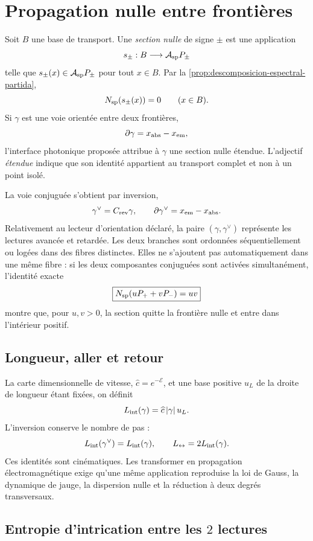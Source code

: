 \section{Propagation nulle entre frontières}
\label{sec:propagacion-nula-fotonica}

Soit \(B\) une base de transport. Une \emph{section nulle} de signe
\(\pm\) est une application
\[
 s_\pm:B\longrightarrow\mathcal A_{\rm sp}P_\pm
\]
telle que \(s_\pm(x)\in\mathcal A_{\rm sp}P_\pm\) pour tout \(x\in B\).
Par la \cref{prop:descomposicion-espectral-partida},
\[
 N_{\rm sp}(s_\pm(x))=0
 \qquad(x\in B).
\]
Si \(\gamma\) est une voie orientée entre deux frontières,
\[
 \partial\gamma=x_{\rm abs}-x_{\rm em},
\]
l'interface photonique proposée attribue à \(\gamma\) une section nulle
étendue. L'adjectif \emph{étendue} indique que son identité appartient au
transport complet et non à un point isolé.

La voie conjuguée s'obtient par inversion,
\[
 \gamma^\vee=C_{\rm rev}\gamma,
 \qquad
 \partial\gamma^\vee=x_{\rm em}-x_{\rm abs}.
\]
Relativement au lecteur d'orientation déclaré, la paire
\((\gamma,\gamma^\vee)\) représente les lectures avancée et retardée. Les
deux branches sont ordonnées séquentiellement ou logées dans des fibres distinctes. Elles ne
s'ajoutent pas automatiquement dans une même fibre : si les deux composantes conjuguées
sont activées simultanément, l'identité exacte
\[
 \boxed{N_{\rm sp}(uP_++vP_-)=uv}
\]
montre que, pour \(u,v>0\), la section quitte la frontière nulle et entre dans
l'intérieur positif.

\subsection{Longueur, aller et retour}

La carte dimensionnelle de vitesse,
\(\widehat c=e^{-\mathcal E}\), et une base positive \(u_L\) de la droite de
longueur étant fixées, on définit
\[
 L_{\rm int}(\gamma)=\widehat c\,|\gamma|\,u_L.
\]
L'inversion conserve le nombre de pas :
\[
 L_{\rm int}(\gamma^\vee)=L_{\rm int}(\gamma),
 \qquad
 L_{\leftrightarrow}=2L_{\rm int}(\gamma).
\]
Ces identités sont cinématiques. Les transformer en propagation
électromagnétique exige qu'une même application reproduise la loi de Gauss, la
dynamique de jauge, la dispersion nulle et la réduction à deux degrés
transversaux.

\subsection{Entropie d'intrication entre les \(2\) lectures}
\label{sec:entrelazamiento-ida-retorno}


